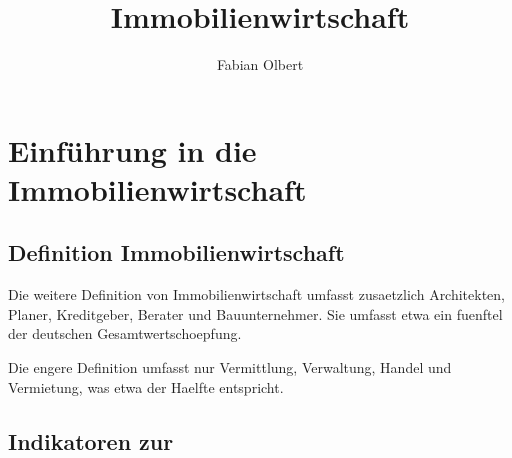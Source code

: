 \documentclass{article}
\title{Immobilienwirtschaft}
\author{Fabian Olbert}
\begin{document}
\maketitle
\section{Einführung in die Immobilienwirtschaft}
\subsection{Definition Immobilienwirtschaft}


Die weitere Definition von Immobilienwirtschaft umfasst zusaetzlich Architekten, Planer, Kreditgeber, Berater und Bauunternehmer. Sie umfasst etwa ein fuenftel der deutschen Gesamtwertschoepfung.

Die engere Definition umfasst nur Vermittlung, Verwaltung, Handel und Vermietung, was etwa der Haelfte entspricht.

\subsection{Indikatoren zur}
\end{document}
